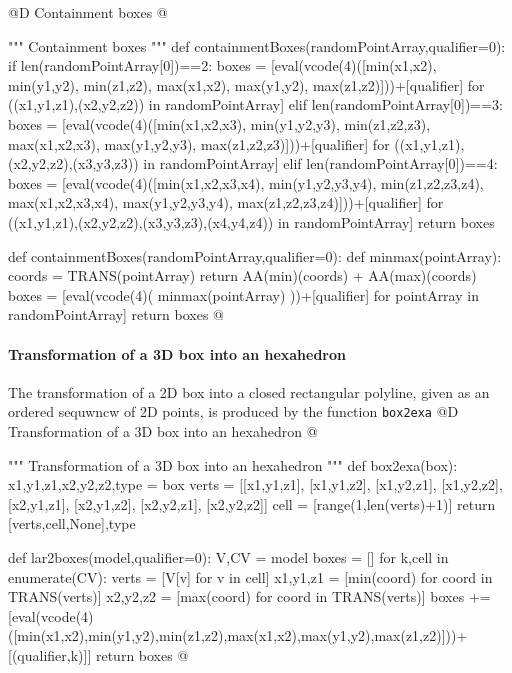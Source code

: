\documentclass[11pt,oneside]{article}    %
\begin{document}
@D Containment boxes
@{""" Containment boxes """
def containmentBoxes(randomPointArray,qualifier=0):
    if len(randomPointArray[0])==2:
        boxes = [eval(vcode(4)([min(x1,x2), min(y1,y2), min(z1,z2), 
                             max(x1,x2), max(y1,y2), max(z1,z2)]))+[qualifier]
                for ((x1,y1,z1),(x2,y2,z2)) in randomPointArray]
    elif len(randomPointArray[0])==3:
        boxes = [eval(vcode(4)([min(x1,x2,x3), min(y1,y2,y3), min(z1,z2,z3), 
                             max(x1,x2,x3), max(y1,y2,y3), max(z1,z2,z3)]))+[qualifier]
                for ((x1,y1,z1),(x2,y2,z2),(x3,y3,z3)) in randomPointArray]
    elif len(randomPointArray[0])==4:
        boxes = [eval(vcode(4)([min(x1,x2,x3,x4), min(y1,y2,y3,y4), min(z1,z2,z3,z4), 
                             max(x1,x2,x3,x4), max(y1,y2,y3,y4), max(z1,z2,z3,z4)]))+[qualifier]
                for ((x1,y1,z1),(x2,y2,z2),(x3,y3,z3),(x4,y4,z4)) in randomPointArray]
    return boxes

def containmentBoxes(randomPointArray,qualifier=0):
    def minmax(pointArray):
        coords = TRANS(pointArray)
        return AA(min)(coords) + AA(max)(coords)
    boxes = [eval(vcode(4)( minmax(pointArray) ))+[qualifier] for pointArray in randomPointArray]
    return boxes
@}

    
\paragraph{Transformation of a 3D box into an hexahedron}
The transformation of a 2D box into a closed rectangular polyline, given as an ordered sequwncw of 2D points, is produced by the function \texttt{box2exa}
@D Transformation of a 3D box into an hexahedron
@{""" Transformation of a 3D box into an hexahedron """    
def box2exa(box):
    x1,y1,z1,x2,y2,z2,type = box
    verts = [[x1,y1,z1], [x1,y1,z2], [x1,y2,z1], [x1,y2,z2], [x2,y1,z1], [x2,y1,z2], [x2,y2,z1], [x2,y2,z2]]
    cell = [range(1,len(verts)+1)]
    return [verts,cell,None],type

def lar2boxes(model,qualifier=0):
    V,CV = model
    boxes = []
    for k,cell in enumerate(CV):
        verts = [V[v] for v in cell]
        x1,y1,z1 = [min(coord) for coord in TRANS(verts)]
        x2,y2,z2 = [max(coord) for coord in TRANS(verts)]
        boxes += [eval(vcode(4)([min(x1,x2),min(y1,y2),min(z1,z2),max(x1,x2),max(y1,y2),max(z1,z2)]))+[(qualifier,k)]]
    return boxes
@}
\end{document}
